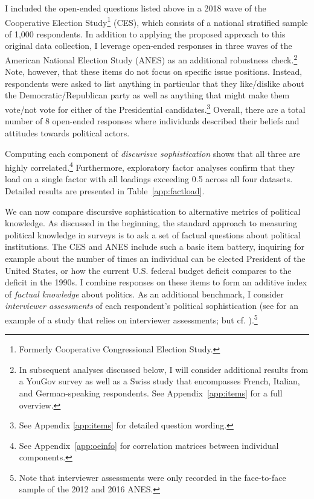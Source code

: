 I included the open-ended questions listed above in a 2018 wave of the Cooperative Election Study\footnote{Formerly Cooperative Congressional Election Study.} (CES), which consists of a national stratified sample of 1,000 respondents. In addition to applying the proposed approach to this original data collection, I leverage open-ended responses in three waves of the American National Election Study (ANES) as an additional robustness check.\footnote{In subsequent analyses discussed below, I will consider additional results from a YouGov survey as well as a Swiss study that encompasses French, Italian, and German-speaking respondents. See Appendix~\ref{app:items} for a full overview.} Note, however, that these items do not focus on specific issue positions. Instead, respondents were asked to list anything in particular that they like/dislike about the Democratic/Republican party as well as anything that might make them vote/not vote for either of the Presidential candidates.\footnote{See Appendix \ref{app:items} for detailed question wording.} Overall, there are a total number of 8 open-ended responses where individuals described their beliefs and attitudes towards political actors.

Computing each component of \textit{discurisve sophistication} shows that all three are highly correlated.\footnote{See Appendix~\ref{app:oeinfo} for correlation matrices between individual components.} Furthermore, exploratory factor analyses confirm that they load on a single factor with all loadings exceeding 0.5 across all four datasets. Detailed results are presented in Table~\ref{app:factload}.



We can now compare discursive sophistication to alternative metrics of political knowledge. As discussed in the beginning, the standard approach to measuring political knowledge in surveys is to ask a set of factual questions about political institutions. The CES and ANES include such a basic item battery, inquiring for example about the number of times an individual can be elected President of the United States, or how the current U.S. federal budget deficit compares to the deficit in the 1990s. I combine responses on these items to form an additive index of \textit{factual knowledge} about politics. As an additional benchmark, I consider \textit{interviewer assessments} of each respondent's political sophistication (see \citealt{bartels2005homer} for an example of a study that relies on interviewer assessments; but cf. \citealt{ryan2011accuracy}).\footnote{Note that interviewer assessments were only recorded in the face-to-face sample of the 2012 and 2016 ANES.}

